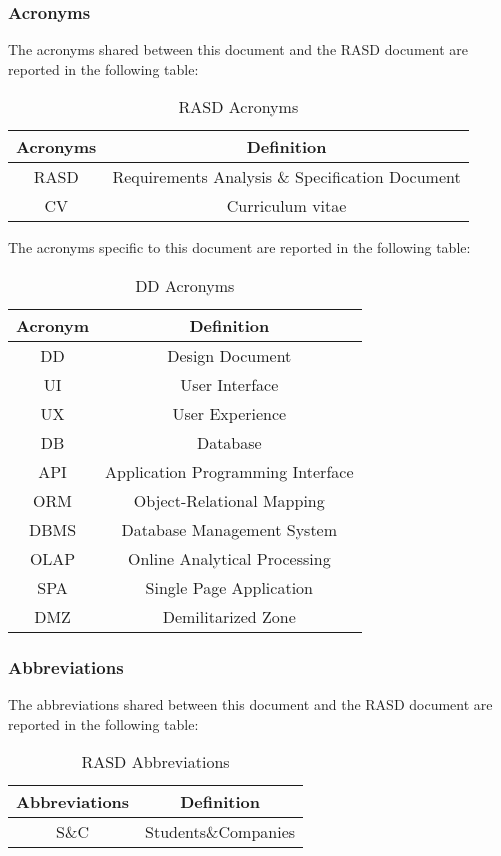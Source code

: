 \subsubsection{Acronyms}
The acronyms shared between this document and the RASD document are reported in the following table:\\
\begin{table}[H]
    \centering
\begin{tabular}{|c|c|}
        \hline
        \textbf{Acronyms} & \textbf{Definition} \\ \hline
        RASD & Requirements Analysis \& Specification Document\\ \hline
        CV & Curriculum vitae\\ \hline
    \end{tabular}
    \caption{RASD Acronyms}
    \label{tab:RASDacronyms}
\end{table}
The acronyms specific to this document are reported in the following table:
\begin{table}[H]
    \centering
    \begin{tabular}{|c|c|}
        \hline
        \textbf{Acronym} & \textbf{Definition} \\ \hline
        DD & Design Document \\ \hline
        UI & User Interface \\ \hline
        UX & User Experience \\ \hline
        DB & Database \\ \hline
        API & Application Programming Interface \\ \hline
        ORM & Object-Relational Mapping \\ \hline
        DBMS & Database Management System \\ \hline
        OLAP & Online Analytical Processing \\ \hline
        SPA & Single Page Application \\ \hline
        DMZ & Demilitarized Zone \\ \hline
    \end{tabular}
    \caption{DD Acronyms}
    \label{tab:DDacronyms}
\end{table}

\subsubsection{Abbreviations}
The abbreviations shared between this document and the RASD document are reported in the following table:
\begin{table}[H]
    \centering
\begin{tabular}{|c|c|}
        \hline
        \textbf{Abbreviations} & \textbf{Definition} \\ \hline
        S\&C & Students\&Companies \\ \hline
    \end{tabular}
    \caption{RASD Abbreviations}
    \label{tab:abbreviations}
\end{table}
